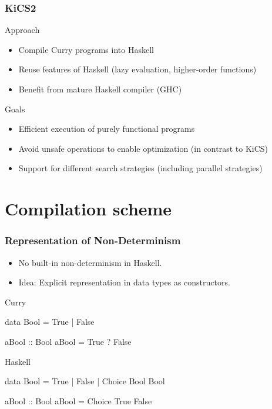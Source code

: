 \documentclass[utf8]{beamer}
\newenvironment{program}{\begin{semiverbatim}\small}{\end{semiverbatim}}
\begin{document}
\begin{frame}
\frametitle{KiCS2}
\begin{block}{Approach}
\begin{itemize}
\item Compile Curry programs into Haskell
\item Reuse features of Haskell (lazy evaluation, higher-order functions)
\item Benefit from mature Haskell compiler (GHC)
\end{itemize}
\end{block}
\pause
\begin{block}{Goals}
\begin{itemize}
\item Efficient execution of purely functional programs
\item Avoid unsafe operations to enable optimization (in contrast to KiCS)
\item Support for different search strategies (including parallel strategies)
\end{itemize}
\end{block}
\end{frame}

\section{Compilation scheme}

\begin{frame}[fragile]
\frametitle{Representation of Non-Determinism}
\begin{itemize}
  \item No built-in non-determinism in Haskell.
  \item Idea: Explicit representation in data types as constructors.
\end{itemize}
\pause
\begin{block}{Curry}
\begin{program}
data Bool = True | False

aBool :: Bool
aBool = True ? False
\end{program}
\end{block}

\begin{block}{Haskell}
\begin{program}
data Bool = True | False | Choice Bool Bool

aBool :: Bool
aBool = Choice True False
\end{program}
\end{block}
\end{frame}
\end{document}
